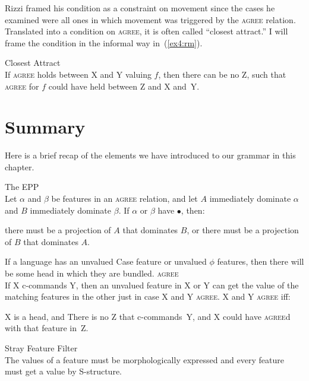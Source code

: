 Rizzi framed his condition as a constraint on movement since the cases he examined were all ones in which movement was triggered by the \textsc{agree} relation. Translated into a condition on \textsc{agree}, it is often called ``closest attract.'' I will frame the condition in the informal way in~(\ref{ex4:rm}).
\begin{exe}
	\raggedright
	\ex \label{ex4:rm} Closest Attract\\
	If \textsc{agree} holds between X and Y valuing $f$, then there can be no Z, such that \textsc{agree} for $f$ could have held between Z and X and~Y.
\end{exe}

\section{Summary}

Here is a brief recap of the elements we have introduced to our grammar in this chapter.
\begin{exe}
\ex \label{ex4:recap}
\begin{xlist}
	\ex The EPP\\
	Let $\alpha$ and $\beta$ be features in an \textsc{agree} relation, and let $A$ immediately dominate $\alpha$ and $B$ immediately dominate $\beta$. If $\alpha$ or $\beta$ have $\bullet$, then:
	\begin{xlist}
		\ex there must be a projection of $A$ that dominates $B$, or
		\ex there must be a projection of $B$ that dominates $A$.
	\end{xlist}
	\ex If a language has an unvalued Case feature or unvalued $\phi$ features, then there will be some head in which they are bundled.
	\ex \textsc{agree}\\
	If X c-commands Y, then an unvalued feature in X or Y can get the value of the matching features in the other just in case X and Y \textsc{agree}. X and Y \textsc{agree} iff:
\begin{xlist}
	\ex X is a head, and
	\ex There is no Z that c-commands~Y, and X could have \textsc{agree}d with that feature in~Z.
\end{xlist}
\ex Stray Feature Filter\\[3pt]
The values of a feature must be morphologically expressed and every feature must get a value by S-structure.
\end{xlist}
\end{exe}

